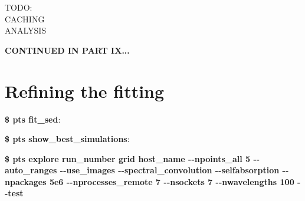 \documentclass[15pt,a4paper,oneside,openright]{report}
\begin{document}
TODO:\\

CACHING\\

ANALYSIS\\

\begin{center}
\textbf{CONTINUED IN PART IX...}
\end{center}

\part{Refining the fitting}

\textbf{\$ pts fit\_sed}:

\textbf{\$ pts show\_best\_simulations}:

\textbf{\$ pts explore run\_number grid host\_name -{}-npoints\_all 5 -{}-auto\_ranges -{}-use\_images -{}-spectral\_convolution -{}-selfabsorption -{}-npackages 5e6 -{}-nprocesses\_remote 7 -{}-nsockets 7 -{}-nwavelengths 100 -{}-test}
\end{document}
